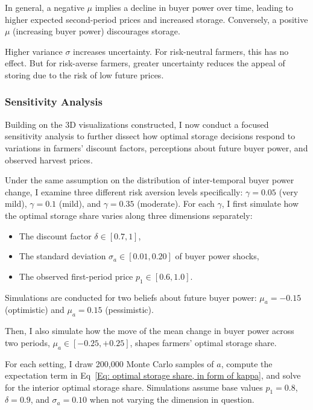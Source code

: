 In general, a negative $\mu$ implies a decline in buyer power over time, leading to higher expected second-period prices and increased storage. Conversely, a positive $\mu$ (increasing buyer power) discourages storage. 

Higher variance $\sigma$ increases uncertainty. For risk-neutral farmers, this has no effect. But for risk-averse farmers, greater uncertainty reduces the appeal of storing due to the risk of low future prices.


\subsubsection{Sensitivity Analysis}
\noindent Building on the 3D visualizations constructed, I now conduct a focused sensitivity analysis to further dissect how optimal storage decisions respond to variations in farmers' discount factors, perceptions about future buyer power, and observed harvest prices.

Under the same assumption on the distribution of inter-temporal buyer power change, I examine three different risk aversion levels specifically: $\gamma = 0.05$ (very mild), $\gamma = 0.1$ (mild), and $\gamma = 0.35$ (moderate). For each $\gamma$, I first simulate how the optimal storage share varies along three dimensions separately:
\begin{itemize}
    \item The discount factor $\delta \in [0.7, 1]$,
    \item The standard deviation $\sigma_a \in [0.01, 0.20]$ of buyer power shocks,
    \item The observed first-period price $p_1 \in [0.6, 1.0]$.
\end{itemize}
Simulations are conducted for two beliefs about future buyer power: $\mu_a = -0.15$ (optimistic) and $\mu_a = 0.15$ (pessimistic).

Then, I also simulate how the move of the mean change in buyer power across two periods, $\mu_a \in [-0.25, +0.25]$, shapes farmers' optimal storage share. 

For each setting, I draw 200,000 Monte Carlo samples of $a$, compute the expectation term in Eq~\ref{Eq: optimal storage share, in form of kappa}, and solve for the interior optimal storage share. Simulations assume base values $p_1 = 0.8$, $\delta = 0.9$, and $\sigma_a = 0.10$ when not varying the dimension in question.


